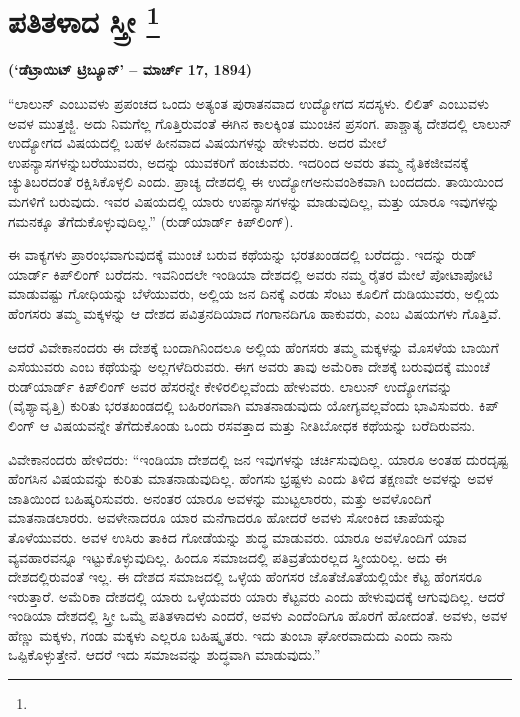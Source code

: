 
\chapter[ಪತಿತಳಾದ ಸ್ತ್ರೀ ]{ಪತಿತಳಾದ ಸ್ತ್ರೀ \protect\footnote{}}

\centerline{\textbf{(‘ಡೆಟ್ರಾಯಿಟ್​ ಟ್ರಿಬ್ಯೂನ್​’ – ಮಾರ್ಚ್​ 17, 1894)}}

“ಲಾಲುನ್​ ಎಂಬುವಳು ಪ್ರಪಂಚದ ಒಂದು ಅತ್ಯಂತ ಪುರಾತನವಾದ ಉದ್ಯೋಗದ ಸದಸ್ಯಳು. ಲಿಲಿತ್​ ಎಂಬುವಳು ಅವಳ ಮುತ್ತಜ್ಜಿ. ಅದು ನಿಮಗೆಲ್ಲ ಗೊತ್ತಿರುವಂತೆ ಈಗಿನ ಕಾಲಕ್ಕಿಂತ ಮುಂಚಿನ ಪ್ರಸಂಗ. ಪಾಶ್ಚಾತ್ಯ ದೇಶದಲ್ಲಿ ಲಾಲುನ್​ ಉದ್ಯೋಗದ ವಿಷಯದಲ್ಲಿ ಬಹಳ ಹೀನವಾದ ವಿಷಯಗಳನ್ನು ಹೇಳುವರು. ಅದರ ಮೇಲೆ ಉಪನ್ಯಾಸಗಳನ್ನು\break ಬರೆಯುವರು, ಅದನ್ನು ಯುವಕರಿಗೆ ಹಂಚುವರು. ಇದರಿಂದ ಅವರು ತಮ್ಮ ನೈತಿಕ\break ಜೀವನಕ್ಕೆ ಚ್ಯುತಿಬರದಂತೆ ರಕ್ಷಿಸಿಕೊಳ್ಳಲಿ ಎಂದು. ಪ್ರಾಚ್ಯ ದೇಶದಲ್ಲಿ ಈ ಉದ್ಯೋಗ\break ಅನುವಂಶಿಕವಾಗಿ ಬಂದದದು. ತಾಯಿಯಿಂದ ಮಗಳಿಗೆ ಬರುವುದು. ಇವರ ವಿಷಯದಲ್ಲಿ ಯಾರು ಉಪನ್ಯಾಸಗಳನ್ನು ಮಾಡುವುದಿಲ್ಲ, ಮತ್ತು ಯಾರೂ ಇವುಗಳನ್ನು ಗಮನಕ್ಕೂ ತೆಗೆದುಕೊಳ್ಳುವುದಿಲ್ಲ.” (ರುಡ್​ಯಾರ್ಡ್​ ಕಿಪ್​ಲಿಂಗ್​).

ಈ ವಾಕ್ಯಗಳು ಪ್ರಾರಂಭವಾಗುವುದಕ್ಕೆ ಮುಂಚೆ ಬರುವ ಕಥೆಯನ್ನು ಭರತಖಂಡದಲ್ಲಿ ಬರೆದದ್ದು. ಇದನ್ನು ರುಡ್​ಯಾರ್ಡ್​ ಕಿಪ್​ಲಿಂಗ್​ ಬರೆದನು. ಇವನಿಂದಲೇ ಇಂಡಿಯಾ ದೇಶದಲ್ಲಿ ಅವರು ನಮ್ಮ ರೈತರ ಮೇಲೆ ಪೋಟಾಪೋಟಿ ಮಾಡುವಷ್ಟು ಗೋಧಿಯನ್ನು ಬೆಳೆಯುವರು, ಅಲ್ಲಿಯ ಜನ ದಿನಕ್ಕೆ ಎರಡು ಸೆಂಟು ಕೂಲಿಗೆ ದುಡಿಯುವರು, ಅಲ್ಲಿಯ ಹೆಂಗಸರು ತಮ್ಮ ಮಕ್ಕಳನ್ನು ಆ ದೇಶದ ಪವಿತ್ರನದಿಯಾದ ಗಂಗಾನದಿಗೂ ಹಾಕುವರು, ಎಂಬ ವಿಷಯಗಳು ಗೊತ್ತಿವೆ.

ಆದರೆ ವಿವೇಕಾನಂದರು ಈ ದೇಶಕ್ಕೆ ಬಂದಾಗಿನಿಂದಲೂ ಅಲ್ಲಿಯ ಹೆಂಗಸರು ತಮ್ಮ ಮಕ್ಕಳನ್ನು ಮೊಸಳೆಯ ಬಾಯಿಗೆ ಎಸೆಯುವರು ಎಂಬ ಕಥೆಯನ್ನು ಅಲ್ಲಗಳೆದಿರುವರು. ಈಗ ಅವರು ತಾವು ಅಮೆರಿಕಾ ದೇಶಕ್ಕೆ ಬರುವುದಕ್ಕೆ ಮುಂಚೆ ರುಡ್​ಯಾರ್ಡ್​ ಕಿಪ್​ಲಿಂಗ್​ ಅವರ ಹೆಸರನ್ನೇ ಕೇಳಿರಲಿಲ್ಲವೆಂದು ಹೇಳುವರು. ಲಾಲುನ್​ ಉದ್ಯೋಗವನ್ನು (ವೈಶ್ಯಾವೃತ್ತಿ) ಕುರಿತು ಭರತಖಂಡದಲ್ಲಿ ಬಹಿರಂಗವಾಗಿ ಮಾತನಾಡುವುದು ಯೋಗ್ಯವಲ್ಲವೆಂದು ಭಾವಿಸುವರು. ಕಿಪ್​ಲಿಂಗ್​ ಆ ವಿಷಯವನ್ನೇ ತೆಗೆದುಕೊಂಡು ಒಂದು ರಸವತ್ತಾದ ಮತ್ತು ನೀತಿಬೋಧಕ ಕಥೆಯನ್ನು ಬರೆದಿರುವನು.

ವಿವೇಕಾನಂದರು ಹೇಳಿದರು: “ಇಂಡಿಯಾ ದೇಶದಲ್ಲಿ ಜನ ಇವುಗಳನ್ನು ಚರ್ಚಿಸುವುದಿಲ್ಲ. ಯಾರೂ ಅಂತಹ ದುರದೃಷ್ಟ ಹೆಂಗಸಿನ ವಿಷಯವನ್ನು ಕುರಿತು ಮಾತನಾಡುವುದಿಲ್ಲ. ಹೆಂಗಸು ಭ್ರಷ್ಟಳು ಎಂದು ತಿಳಿದ ತಕ್ಷಣವೇ ಅವಳನ್ನು ಅವಳ ಜಾತಿಯಿಂದ ಬಹಿಷ್ಕರಿಸುವರು. ಅನಂತರ ಯಾರೂ ಅವಳನ್ನು ಮುಟ್ಟಲಾರರು, ಮತ್ತು ಅವಳೊಂದಿಗೆ ಮಾತನಾಡಲಾರರು. ಅವಳೇನಾದರೂ ಯಾರ ಮನೆಗಾದರೂ ಹೋದರೆ ಅವಳು ಸೋಂಕಿದ ಚಾಪೆಯನ್ನು ತೊಳೆಯುವರು. ಅವಳ ಉಸಿರು ತಾಕಿದ ಗೋಡೆಯನ್ನು ಶುದ್ಧ ಮಾಡುವರು. ಯಾರೂ ಅವಳೊಂದಿಗೆ ಯಾವ ವ್ಯವಹಾರವನ್ನೂ ಇಟ್ಟುಕೊಳ್ಳುವುದಿಲ್ಲ. ಹಿಂದೂ ಸಮಾಜದಲ್ಲಿ ಪತಿವ್ರತೆಯರಲ್ಲದ ಸ್ತ್ರೀಯರಿಲ್ಲ. ಅದು ಈ ದೇಶದಲ್ಲಿರುವಂತೆ ಇಲ್ಲ. ಈ ದೇಶದ ಸಮಾಜದಲ್ಲಿ ಒಳ್ಳೆಯ ಹೆಂಗಸರ ಜೊತೆಜೊತೆಯಲ್ಲಿಯೇ ಕೆಟ್ಟ ಹೆಂಗಸರೂ ಇರುತ್ತಾರೆ. ಅಮೆರಿಕಾ ದೇಶದಲ್ಲಿ ಯಾರು ಒಳ್ಳೆಯವರು ಯಾರು ಕೆಟ್ಟವರು ಎಂದು ಹೇಳುವುದಕ್ಕೆ ಆಗುವುದಿಲ್ಲ. ಆದರೆ ಇಂಡಿಯಾ ದೇಶದಲ್ಲಿ ಸ್ತ್ರೀ ಒಮ್ಮೆ ಪತಿತಳಾದಳು ಎಂದರೆ, ಅವಳು ಎಂದೆಂದಿಗೂ ಹೊರಗೆ ಹೋದಂತೆ. ಅವಳು, ಅವಳ ಹೆಣ್ಣು ಮಕ್ಕಳು, ಗಂಡು ಮಕ್ಕಳು ಎಲ್ಲರೂ ಬಹಿಷ್ಕೃತರು. ಇದು ತುಂಬಾ ಘೋರವಾದುದು ಎಂದು ನಾನು ಒಪ್ಪಿಕೊಳ್ಳುತ್ತೇನೆ. ಆದರೆ ಇದು ಸಮಾಜವನ್ನು ಶುದ್ಧವಾಗಿ ಮಾಡುವುದು.”

